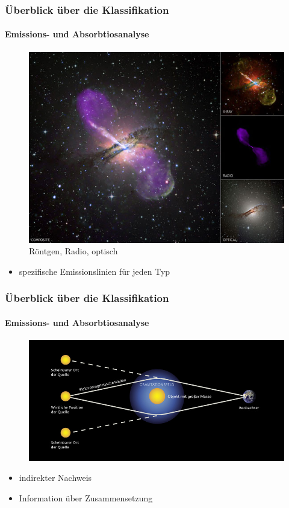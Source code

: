 \begin{frame}
\frametitle{Überblick über die Klassifikation}
\framesubtitle{Emissions- und Absorbtiosanalyse}


\begin{figure}
\includegraphics[scale=0.35]{Radiogalaxie.jpg}
\caption{Röntgen, Radio, optisch}
\end{figure}

\begin{itemize}
\item spezifische Emissionslinien für jeden Typ
\end{itemize}

\end{frame}


\begin{frame}
\frametitle{Überblick über die Klassifikation}
\framesubtitle{Emissions- und Absorbtiosanalyse}

\begin{figure}
\includegraphics[scale=0.7]{Gravitationslinse.jpg}
\end{figure}

\begin{itemize}
\item indirekter Nachweis
\item Information über Zusammensetzung
\end{itemize}

\end{frame}


